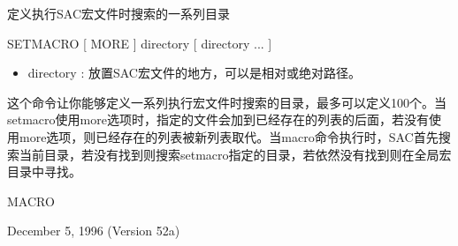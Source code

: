 \label{cmd:setmacro}

定义执行SAC宏文件时搜索的一系列目录

SETMACRO  [ MORE ] directory [ directory ... ]

\begin{itemize}
\item directory : 放置SAC宏文件的地方，可以是相对或绝对路径。
\end{itemize}

这个命令让你能够定义一系列执行宏文件时搜索的目录，最多可以定义100个。当setmacro使用more选项时，指定的文件会加到已经存在的列表的后面，若没有使用more选项，则已经存在的列表被新列表取代。当macro命令执行时，SAC首先搜索当前目录，若没有找到则搜索setmacro指定的目录，若依然没有找到则在全局宏目录中寻找。

MACRO

December 5, 1996 (Version 52a)
